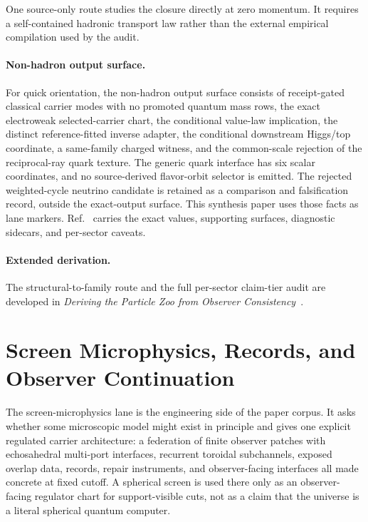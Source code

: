 One source-only route studies the closure directly at zero momentum. It requires a self-contained
hadronic transport law rather than the external empirical compilation used by the audit.

\paragraph{Non-hadron output surface.}
For quick orientation, the non-hadron output surface consists of receipt-gated classical carrier
modes with no promoted quantum mass rows, the exact electroweak selected-carrier chart, the
conditional value-law implication, the distinct reference-fitted inverse adapter, the conditional
downstream Higgs/top coordinate, a same-family charged witness, and the common-scale rejection of
the reciprocal-ray quark texture. The generic quark interface has six scalar coordinates, and no
source-derived flavor-orbit selector is emitted. The rejected weighted-cycle neutrino
candidate is retained as a comparison and falsification record, outside the exact-output surface.
This synthesis paper uses those facts as lane markers. Ref.~\cite{ophparticles} carries the exact
values, supporting surfaces, diagnostic sidecars, and per-sector caveats.

\paragraph{Extended derivation.}
The structural-to-family route and the full per-sector claim-tier audit are developed in
\emph{Deriving the Particle Zoo from Observer Consistency}~\cite{ophparticles}.

\section{Screen Microphysics, Records, and Observer Continuation}

The screen-microphysics lane is the engineering side of the paper corpus. It asks
whether some microscopic model might exist in principle and gives one explicit regulated
carrier architecture: a federation of finite observer patches with echosahedral multi-port
interfaces, recurrent toroidal subchannels, exposed overlap data, records, repair instruments,
and observer-facing interfaces all made concrete at fixed cutoff. A spherical screen is used
there only as an observer-facing regulator chart for support-visible cuts, not as a claim that
the universe is a literal spherical quantum computer.

